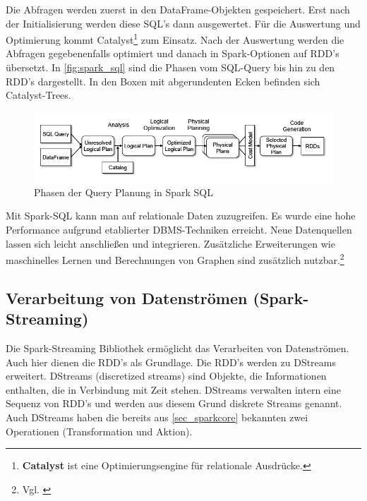 \noindent
Die Abfragen werden zuerst in den DataFrame-Objekten gespeichert. Erst nach der Initialisierung werden diese SQL's dann ausgewertet. Für die Auswertung und Optimierung kommt Catalyst\footnote{\textbf{Catalyst} ist eine Optimierungsengine für relationale Ausdrücke.} zum Einsatz. Nach der Auswertung werden die Abfragen gegebenenfalls optimiert und danach in Spark-Optionen auf RDD's übersetzt. In \autoref{fig:spark_sql} sind die Phasen vom SQL-Query bis hin zu den RDD's dargestellt. In den Boxen mit abgerundenten Ecken befinden sich Catalyst-Trees.

\begin{figure}[h]
  \centering
  \includegraphics[width=\textwidth]{./bilder/spark_sql.png}
  \caption{Phasen der Query Planung in Spark SQL \cite{AXL+15}}\label{fig:spark_sql}
\end{figure}

\noindent
Mit Spark-SQL kann man auf relationale Daten zuzugreifen. Es wurde eine hohe Performance aufgrund etablierter DBMS-Techniken erreicht.
Neue Datenquellen lassen sich leicht anschließen und integrieren.
Zusätzliche Erweiterungen wie maschinelles Lernen und Berechnungen von Graphen sind zusätzlich nutzbar.\footnote{Vgl. \cite{AXL+15}} \\

\newpage
\subsection{Verarbeitung von Datenströmen (Spark-Streaming)}


Die Spark-Streaming Bibliothek ermöglicht das Verarbeiten von Datenströmen. Auch hier dienen die RDD's als Grundlage. Die RDD's werden zu DStreams erweitert. DStreams (discretized streams) sind Objekte, die Informationen enthalten, die in Verbindung mit Zeit stehen. DStreams verwalten intern eine Sequenz von RDD's und werden aus diesem Grund diskrete Streams genannt.
Auch DStreams haben die bereits aus \ref{sec_sparkcore} bekannten zwei Operationen (Transformation und Aktion). \\

